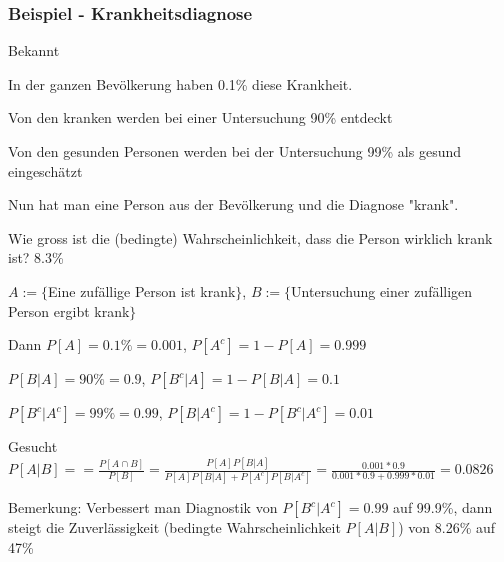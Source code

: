 \subsubsection{Beispiel - Krankheitsdiagnose}
\enumstart
	\item Bekannt
	\enumstart
		\item In der ganzen Bevölkerung haben 0.1\% diese Krankheit.
		\item Von den kranken werden bei einer Untersuchung 90\% entdeckt
		\item Von den gesunden Personen werden bei der Untersuchung 99\% als gesund eingeschätzt
	\enumend
	\item Nun hat man eine Person aus der Bevölkerung und die Diagnose "krank".
	\item Wie gross ist die (bedingte) Wahrscheinlichkeit, dass die Person wirklich krank ist? 8.3\%
	\item $A := \{$Eine zufällige Person ist krank$\}$, $B := \{$Untersuchung einer zufälligen Person ergibt krank$\}$
	\item Dann $P[A] = 0.1\% = 0.001$, $P[A^c] = 1 - P[A] = 0.999$
	\item $P[B | A] = 90\% = 0.9$, $P[B^c | A] = 1 - P[B | A] = 0.1$
	\item $P[B^c | A^c] = 99\% = 0.99$, $P[B | A^c] = 1 - P[B^c | A^c] = 0.01$
	\item Gesucht $P[A | B] = = \frac{P[A \cap B]}{P[B]} = \frac{P[A]P[B | A]}{P[A]P[B | A] + P[A^c]P[B | A^c]} = \frac{0.001*0.9}{0.001*0.9 + 0.999*0.01} = 0.0826$
	\item Bemerkung: Verbessert man Diagnostik von $P[B^c | A^c] = 0.99$ auf 99.9\%, dann steigt die Zuverlässigkeit (bedingte Wahrscheinlichkeit $P[A | B]$) von 8.26\% auf 47\%
\enumend
